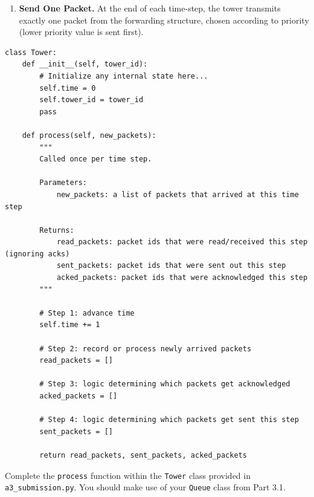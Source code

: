 \documentclass[12pt]{report}
\begin{document}
\begin{itemize}
\begin{enumerate}
        \item \textbf{Send One Packet.}  
              At the end of each time-step, the tower transmits exactly one packet from the forwarding structure, chosen according to priority (lower priority value is sent first).
    \end{enumerate}
\end{itemize}
\begin{lstlisting}[style=mypython]
class Tower:
    def __init__(self, tower_id):
        # Initialize any internal state here...
        self.time = 0
        self.tower_id = tower_id
        pass

    def process(self, new_packets):
        """
        Called once per time step.

        Parameters:
            new_packets: a list of packets that arrived at this time step

        Returns:
            read_packets: packet ids that were read/received this step (ignoring acks)
            sent_packets: packet ids that were sent out this step
            acked_packets: packet ids that were acknowledged this step
        """

        # Step 1: advance time
        self.time += 1

        # Step 2: record or process newly arrived packets
        read_packets = []

        # Step 3: logic determining which packets get acknowledged
        acked_packets = []

        # Step 4: logic determining which packets get sent this step
        sent_packets = []

        return read_packets, sent_packets, acked_packets

\end{lstlisting}
Complete the \texttt{process} function within the \texttt{Tower} class provided in \texttt{a3\_submission.py}. You should make use of your \texttt{Queue} class from Part 3.1.

\clearpage
\end{document}
